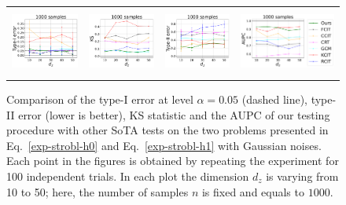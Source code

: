 \begin{figure}[h]
\begin{tabular}{cccc} 
\includegraphics[height=2.2cm]{sections/appendix/independence_testing_kernel/figures_strobl_highdim_gaussian/nsamples_fixed_1000_strobl_dim_10_50_typeI.pdf}& \includegraphics[height=2.2cm]{sections/appendix/independence_testing_kernel/figures_strobl_highdim_gaussian/nsamples_fixed_1000_strobl_dim_10_50_ks.pdf} & 
\includegraphics[height=2.2cm]{sections/appendix/independence_testing_kernel/figures_strobl_highdim_gaussian/nsamples_fixed_1000_strobl_dim_10_50_typeII.pdf}& \includegraphics[height=2.2cm]{sections/appendix/independence_testing_kernel/figures_strobl_highdim_gaussian/nsamples_fixed_1000_strobl_dim_10_50_aupc.pdf}
\end{tabular}
\caption{Comparison of the type-I error at level $\alpha=0.05$ (dashed line), type-II error (lower is better), KS statistic and the AUPC of our testing procedure with other SoTA tests on the two problems presented in Eq.~\eqref{exp-strobl-h0} and Eq.~\eqref{exp-strobl-h1} with Gaussian noises. Each point in the figures is obtained by repeating the experiment for 100 independent trials. In each plot the dimension $d_z$ is varying from 10 to 50; here, the number of samples $n$ is fixed and equals to $1000$. 
\label{fig-exp-strobl-highdim-gaussian-supp}}
\vspace{-0.6cm}
\end{figure}











